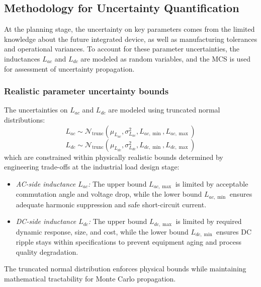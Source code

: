 \subsection{Methodology for Uncertainty Quantification}
At the planning stage, the uncertainty on key parameters comes from the limited knowledge about the future integrated device, as well as manufacturing tolerances and operational variances. To account for these parameter uncertainties, the inductances $L_{ac}$ and $L_{dc}$ are modeled as random variables, and the MCS is used for assessment of uncertainty propagation.

\subsubsection{Realistic parameter uncertainty bounds}
The uncertainties on $L_{ac}$ and $L_{dc}$ are modeled using truncated normal distributions:
\begin{equation}
L_{ac} \sim \mathcal{N}_{\text{trunc}}(\mu_{L_{ac}}, \sigma_{L_{ac}}^2, L_{ac,\min}, L_{ac,\max})
\label{truncated_normal_lac}
\end{equation}
\begin{equation}
L_{dc} \sim \mathcal{N}_{\text{trunc}}(\mu_{L_{dc}}, \sigma_{L_{dc}}^2, L_{dc,\min}, L_{dc,\max})
\label{truncated_normal_ldc}
\end{equation}
which are constrained within physically realistic bounds determined by engineering trade-offs at the industrial load design stage:
\begin{itemize}
    \item \textit{AC-side inductance $L_{ac}$:} The upper bound $L_{ac,\max}$ is limited by acceptable commutation angle and voltage drop, while the lower bound $L_{ac,\min}$ ensures adequate harmonic suppression and safe short-circuit current.

    \item \textit{DC-side inductance $L_{dc}$:} The upper bound $L_{dc,\max}$ is limited by required dynamic response, size, and cost, while the lower bound $L_{dc,\min}$ ensures DC ripple stays within specifications to prevent equipment aging and process quality degradation.
\end{itemize}

The truncated normal distribution enforces physical bounds while maintaining mathematical tractability for Monte Carlo propagation.

